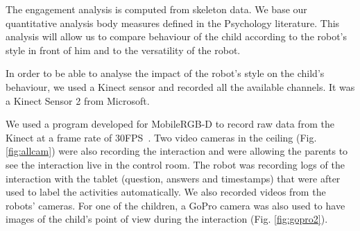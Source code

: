\documentclass[a4paper,twocolumn]{svjour3}
\begin{document}
The engagement analysis is computed from skeleton data.
We base our quantitative analysis body measures defined in the Psychology literature.
This analysis will allow us to compare behaviour of the child according to the robot's style in front of him and to the versatility of the robot.


In order to be able to analyse the impact of the robot's style on the child's behaviour, we used a Kinect sensor and recorded all the available channels. 
It was a Kinect Sensor 2 from Microsoft. 

We used a program developed for MobileRGB-D to record raw data from the Kinect at a frame rate of 30FPS~\cite{MobileRGB}. 
Two video cameras in the ceiling (Fig. \ref{fig:allcam})  were also recording the interaction and were allowing the parents to see the interaction live in the control room. 
The robot was recording logs of the interaction with the tablet (question, answers and timestamps) that were after used to label the activities  automatically.  
We also recorded videos from the robots' cameras. 
For one of the children, a GoPro camera was also used to have images of the child's point of view during the interaction (Fig. \ref{fig:gopro2}).
\end{document}
